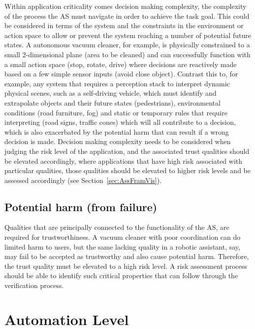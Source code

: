 Within application criticality comes decision making complexity, the complexity of the process the AS must navigate in order to achieve the task goal. This could be considered in terms of the system and the constraints in the environment or action space to allow or prevent the system reaching a number of potential future states. A autonomous vacuum cleaner, for example, is physically constrained to a small 2-dimensional plane (area to be cleaned) and can successfully function with a small action space (stop, rotate, drive) where decisions are reactively made based on a few simple sensor inputs (avoid close object). 
%
Contrast this to, for example, any system that requires a perception stack to interpret dynamic physical scenes, such as a self-driving vehicle, which must identify and extrapolate objects and their future states (pedestrians), environmental conditions (road furniture, fog) and static or temporary rules that require interpreting (road signs, traffic cones) which will all contribute to a decision, which is also exacerbated by the potential harm that can result if a wrong decision is made. 
%
Decision making complexity needs to be considered when judging the risk level of the application, and the associated trust qualities should be elevated accordingly, where applications that have high risk associated with particular qualities, those qualities should be elevated to higher risk levels and be assessed accordingly (see Section~\ref{sec:AssFramVis}).  

\subsection{Potential harm (from failure)} \label{sec:app-harm}

Qualities that are principally connected to the functionality of the AS, are required for trustworthiness. A vacuum cleaner with poor coordination can do limited harm to users, but the same lacking quality in a robotic assistant, say, may fail to be accepted as trustworthy and also cause potential harm. Therefore, the trust quality must be elevated to a high risk level.
%
A risk assessment process should be able to identify such critical properties that can follow through the verification process. 


\section{Automation Level} \label{sec:autlev}

